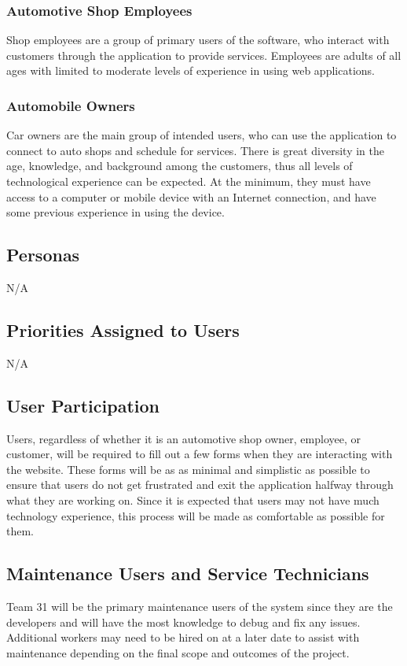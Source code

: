 \documentclass[12pt]{article}
\begin{document}
\subsubsection{Automotive Shop Employees}
Shop employees are a group of primary users of the software, who interact with
customers through the application to provide services. Employees are adults of
all ages with limited to moderate levels of experience in using web 
applications.

\subsubsection{Automobile Owners}
Car owners are the main group of intended users, who can use the application
to connect to auto shops and schedule for services. There is great diversity in
the age, knowledge, and background among the customers, thus all levels of
technological experience can be expected. At the minimum, they must have 
access to a computer or mobile device with an Internet connection, and have
some previous experience in using the device.

\subsection{Personas}
N/A
\subsection{Priorities Assigned to Users}
N/A
\subsection{User Participation}
Users, regardless of whether it is an automotive shop owner, employee, or customer, will be required to fill out a few forms when they are interacting
with the website. These forms will be as as minimal and simplistic as possible to ensure that users do not get frustrated and exit the application
halfway through what they are working on. Since it is expected that users may not have much technology experience, this process will be made as
comfortable as possible for them.

\subsection{Maintenance Users and Service Technicians}
Team 31 will be the primary maintenance users of the system since they are the developers and will have the most knowledge to debug and fix any issues.
Additional workers may need to be hired on at a later date to assist with maintenance depending on the final scope and outcomes of the project.
\end{document}

